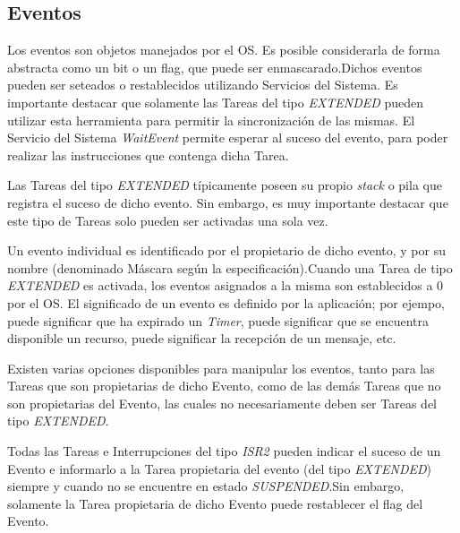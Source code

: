 \documentclass[12pt,letterpaper]{article}
\begin{document}
\subsection{Eventos}

Los eventos son objetos manejados por el OS. Es posible considerarla de forma abstracta como un bit o un flag, que puede ser enmascarado.Dichos eventos pueden ser seteados o restablecidos utilizando Servicios del Sistema. Es importante destacar que solamente las Tareas del tipo \textit{EXTENDED} pueden utilizar esta herramienta para permitir la sincronización de las mismas. El Servicio del Sistema \textit{WaitEvent} permite esperar al suceso del evento, para poder realizar las instrucciones que contenga dicha Tarea.

Las Tareas del tipo \textit{EXTENDED} típicamente poseen su propio \textit{stack} o pila que registra el suceso de dicho evento. Sin embargo, es muy importante destacar que este tipo de Tareas solo pueden ser activadas una sola vez.

Un evento individual es identificado por el propietario de dicho evento, y por su nombre (denominado Máscara según la especificación).Cuando una Tarea de tipo \textit{EXTENDED} es activada, los eventos asignados a la misma son establecidos a 0 por el OS. El significado de un evento es definido por la aplicación; por ejempo, puede significar que ha expirado un \textit{Timer}, puede significar que se encuentra disponible un recurso, puede significar la recepción de un mensaje, etc.

Existen varias opciones disponibles para manipular los eventos, tanto para las Tareas que son propietarias de dicho Evento, como de las demás Tareas que no son propietarias del Evento, las cuales no necesariamente deben ser Tareas del tipo \textit{EXTENDED}.

Todas las Tareas e Interrupciones del tipo \textit{ISR2} pueden indicar el suceso de un Evento e informarlo a la Tarea propietaria del evento (del tipo \textit{EXTENDED}) siempre y cuando no se encuentre en estado \textit{SUSPENDED}.Sin embargo, solamente la Tarea propietaria de dicho Evento puede restablecer el flag del Evento.
\end{document}
